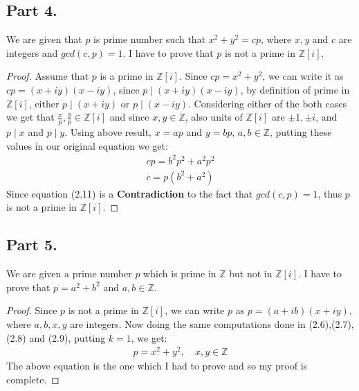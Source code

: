 \documentclass{article}
\begin{document}
{  \subsection{Part 4.}{
    We are given that $p$ is prime number such that $x^2+y^2=cp$, where $x,y$ and $c$ are integers and $gcd(c,p)=1$. \newline
    I have to prove that $p$ is not a prime in $\mathbb{Z}[i]$. \newline
    \begin{proof}
      Assume that $p$ is a prime in $\mathbb{Z}[i]$. \newline
      Since $cp=x^2+y^2$, we can write it as $cp=(x+iy)(x-iy)$, since $p \mid (x+iy)(x-iy)$, by definition of prime in $\mathbb{Z}[i]$, either $p \mid (x+iy)$ or $p \mid (x-iy)$. \newline
      Considering either of the both cases we get that $\frac{x}{p},\frac{y}{p} \in \mathbb{Z}[i]$ and since $x,y \in \mathbb{Z}$, also units of $\mathbb{Z}[i]$ are $\pm1,\pm i$, and $p \mid x$ and $p \mid y$. \newline
      Using above result, $x=ap$ and $y=bp$, $a,b \in \mathbb{Z}$, putting these values in our original equation we get:
      \begin{align}
        cp=b^2p^2+a^2p^2 \label{eq:10} \\
        c=p(b^2+a^2)
      \end{align}
      Since equation (2.11) is a \textbf{Contradiction} to the fact that $gcd(c,p)=1$, thus $p$ is not a prime in $\mathbb{Z}[i]$.
    \end{proof}
  }
  \subsection{Part 5.}{
    We are given a prime number $p$ which is prime in $\mathbb{Z}$ but not in $\mathbb{Z}[i]$. \newline
    I have to prove that $p=a^2+b^2$ and $a,b \in \mathbb{Z}$.
    \begin{proof}
      Since $p$ is not a prime in $\mathbb{Z}[i]$, we can write $p$ as $p=(a+ib)(x+iy)$, where $a,b,x,y$ are integers. \newline
      Now doing the same computations done in (2.6),(2.7),(2.8) and (2.9), putting $k=1$, we get:
      \begin{align*}
        p=x^2+y^2, \quad x,y \in \mathbb{Z}
      \end{align*}
      The above equation is the one which I had to prove and so my proof is complete.
    \end{proof}
  }
}
\end{document}
